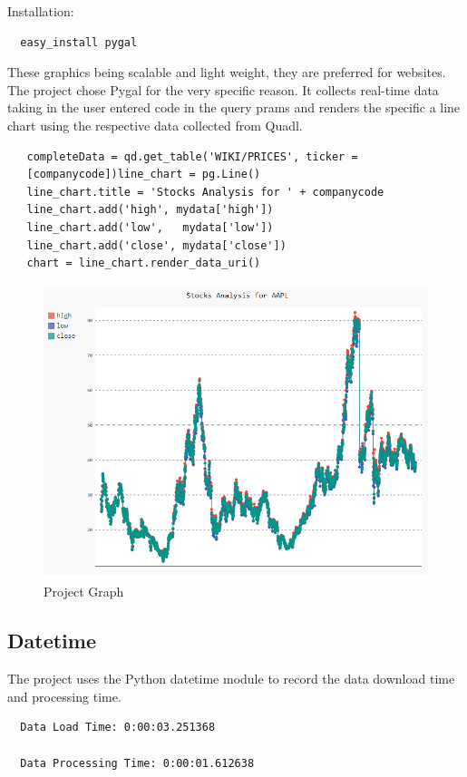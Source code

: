 Installation:

\begin{verbatim}
  easy_install pygal
\end{verbatim}

These graphics being scalable and light weight, they are preferred for
websites. The project chose Pygal for the very specific reason. It collects
real-time data taking in the user entered code in the query prams and renders
the specific a line chart using the respective data collected from Quadl.
\begin{verbatim}
   completeData = qd.get_table('WIKI/PRICES', ticker =
   [companycode])line_chart = pg.Line()
   line_chart.title = 'Stocks Analysis for ' + companycode
   line_chart.add('high', mydata['high'])
   line_chart.add('low',   mydata['low'])
   line_chart.add('close', mydata['close'])
   chart = line_chart.render_data_uri()
\end{verbatim}
\begin{figure}[htb]
	\centering\includegraphics[width=\columnwidth]{images/hid_417_project_graph.png}
  \caption{Project Graph}
  \label{fig:project_graph}
\end{figure}
\subsection{Datetime}

The project uses the Python datetime module to record the data download time
and processing time.
\begin{verbatim}
  Data Load Time: 0:00:03.251368

  Data Processing Time: 0:00:01.612638
\end{verbatim}

